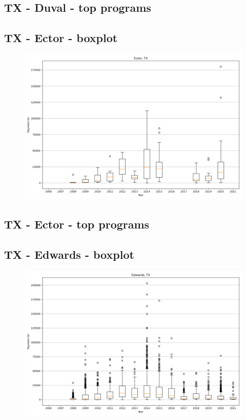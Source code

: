 \subsection*{TX - Duval - top programs}

\newpage
\subsection*{TX - Ector - boxplot}
\begin{figure}[h]
\centering
\includegraphics[width=7in]{../output/boxplots/counties/Ector-TX_boxplot.png}
\end{figure}


\subsection*{TX - Ector - top programs}

\newpage
\subsection*{TX - Edwards - boxplot}
\begin{figure}[h]
\centering
\includegraphics[width=7in]{../output/boxplots/counties/Edwards-TX_boxplot.png}
\end{figure}


